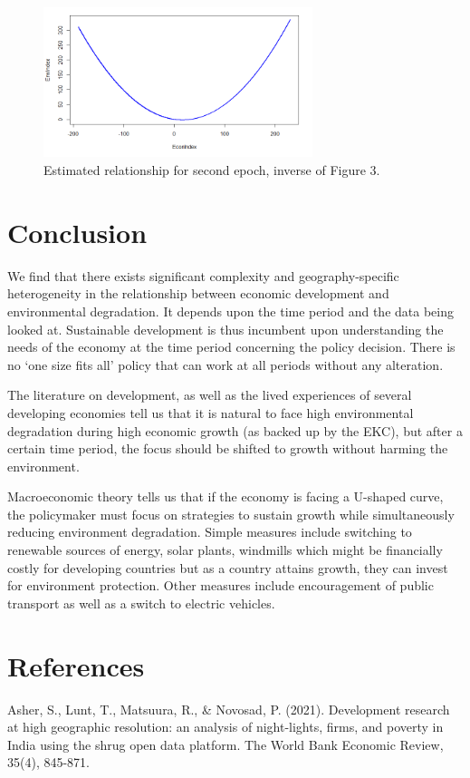 \documentclass{article}
\begin{document}
\begin{figure}[h]
    \centering
    \includegraphics[width=0.7\textwidth]{images/notkuznets.png}
    \caption{Estimated relationship for second epoch, inverse of Figure 3.}
\end{figure}


\section{Conclusion}

We find that there exists significant complexity and geography-specific heterogeneity in the relationship between economic development and environmental degradation. It depends upon the time period and the data being looked at. Sustainable development is thus incumbent upon understanding the needs of the economy at the time period concerning the policy decision. There is no ‘one size fits all’ policy that can work at all periods without any alteration.

The literature on development, as well as the lived experiences of several developing economies tell us that it is natural to face high environmental degradation during high economic growth (as backed up by the EKC), but after a certain time period, the focus should be shifted to growth without harming the environment. 

Macroeconomic theory tells us that if the economy is facing a U-shaped curve, the policymaker must focus on strategies to sustain growth while simultaneously reducing environment degradation. Simple measures include switching to renewable sources of energy, solar plants, windmills which might be financially costly for developing countries but as a country attains growth, they can invest for environment protection. Other measures include encouragement of public transport as well as a switch to electric vehicles.



\section{References}
Asher, S., Lunt, T., Matsuura, R., \& Novosad, P. (2021). Development research at high geographic resolution: an analysis of night-lights, firms, and poverty in India using the shrug open data platform. The World Bank Economic Review, 35(4), 845-871.
\end{document}
